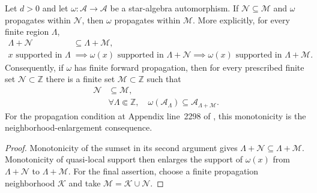 \begin{lemma}
    \label{lem:qca_propagation_neighborhood_mono}
    \leanok
    Let $d>0$ and let $\omega\colon\mathcal A\to\mathcal A$ be a star-algebra
    automorphism.  If $\mathcal N\subseteq\mathcal M$ and $\omega$ propagates
    within $\mathcal N$, then $\omega$ propagates within $\mathcal M$.  More
    explicitly, for every finite region $\Lambda$,
    \begin{align}
        \Lambda+\mathcal N & \subseteq\Lambda+\mathcal M,                              \\
        x\text{ supported in }\Lambda
                           & \implies \omega(x)\text{ supported in }\Lambda+\mathcal N
        \implies \omega(x)\text{ supported in }\Lambda+\mathcal M.
    \end{align}
    Consequently, if $\omega$ has finite forward propagation, then for every
    prescribed finite set $\mathcal N\subset\mathbb Z$ there is a finite set
    $\mathcal M\subset\mathbb Z$ such that
    \begin{align}
        \mathcal N & \subseteq\mathcal M,                 \\
                   & \forall\Lambda\Subset\mathbb Z,\quad
        \omega(\mathcal A_\Lambda)\subseteq
        \mathcal A_{\Lambda+\mathcal M}.
    \end{align}
    For the propagation condition at Appendix line~2298 of \cite{Cirac2017MPU}, this monotonicity is the neighborhood-enlargement
    consequence.
\end{lemma}

\begin{proof}\leanok
    Monotonicity of the sumset in its second argument gives
    $\Lambda+\mathcal N\subseteq\Lambda+\mathcal M$.  Monotonicity of
    quasi-local support then enlarges the support of $\omega(x)$ from
    $\Lambda+\mathcal N$ to $\Lambda+\mathcal M$.  For the final assertion,
    choose a finite propagation neighborhood $\mathcal K$ and take
    $\mathcal M=\mathcal K\cup\mathcal N$.
\end{proof}

